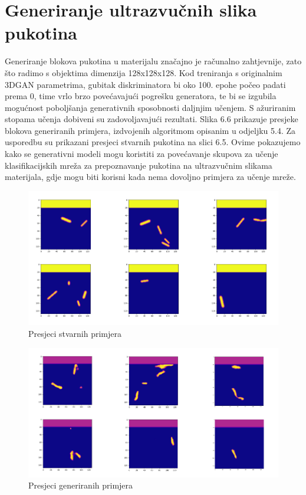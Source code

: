 \documentclass[times, utf8, diplomski]{fer}
\begin{document}
\section{Generiranje ultrazvučnih slika pukotina}
Generiranje blokova pukotina u materijalu značajno je računalno zahtjevnije, zato što radimo s objektima dimenzija 128x128x128. Kod treniranja s originalnim 3DGAN parametrima, gubitak diskriminatora bi oko 100. epohe počeo padati prema 0, time vrlo brzo povećavajući pogrešku generatora, te bi se izgubila mogućnost poboljšanja generativnih sposobnosti daljnjim učenjem. S ažuriranim stopama učenja dobiveni su zadovoljavajući rezultati. Slika 6.6 prikazuje presjeke blokova generiranih primjera, izdvojenih algoritmom opisanim u odjeljku 5.4. Za usporedbu su prikazani presjeci stvarnih pukotina na slici 6.5. Ovime pokazujemo kako se generativni modeli mogu koristiti za povećavanje skupova za učenje klasifikacijskih mreža za prepoznavanje pukotina na ultrazvučnim slikama materijala, gdje mogu biti korisni kada nema dovoljno primjera za učenje mreže.

\begin{figure}[h]
\centering
\includegraphics[scale=0.6]{dataset_6plot.png}   
\caption{Presjeci stvarnih primjera}
\end{figure}

\begin{figure}[h]
\centering
\includegraphics[scale=0.6]{generated_6plot.png}   
\caption{Presjeci generiranih primjera}
\end{figure}
\end{document}
